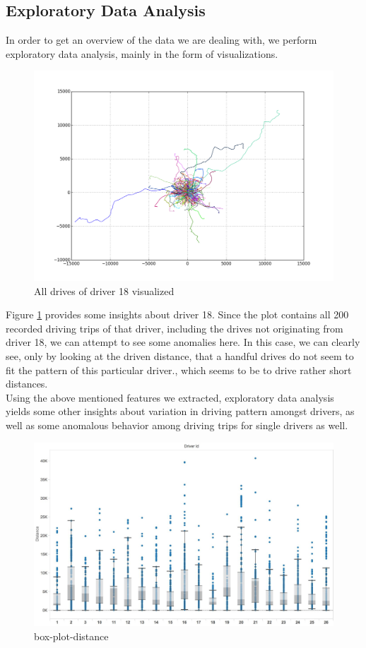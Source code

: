 \documentclass{vldb}
\begin{document}
\subsection{Exploratory Data Analysis}
In order to get an overview of the data we are dealing with, we perform exploratory data analysis, mainly in the form of visualizations.  
\begin{figure}
\centering
\includegraphics[width= 1\linewidth]{"pics/all_drives_18"}%
\caption{All drives of driver 18 visualized}
\label{fig:driver-18}
\end{figure}
Figure \ref{fig:driver-18} provides some insights about driver 18. Since the plot contains all 200 recorded driving trips of that driver, including the drives not originating from driver 18, we can attempt to see some anomalies here. In this case, we can clearly see, only by looking at the driven distance, that a handful drives do not seem to fit the pattern of  this particular driver., which seems to be to drive rather short distances.\\
Using the above mentioned features we extracted, exploratory data analysis yields some other insights about variation in driving pattern amongst drivers, as well as some anomalous behavior among driving trips for single drivers as well. 
\begin{figure}
\centering
\includegraphics[width=\linewidth]{"pics/box-plot-distance"}%
\caption{box-plot-distance }
\label{fig:box-plot-distance}
\end{figure}
\end{document}
